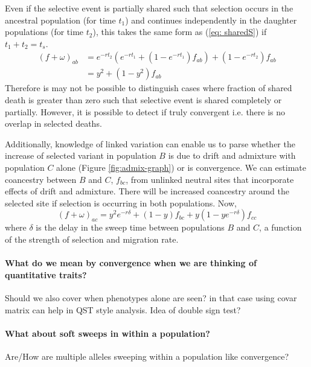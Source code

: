 \documentclass[a4paper,10pt]{article}
\begin{document}
Even if the selective event is partially shared such that selection occurs in the ancestral population (for time $t_1$) and continues independently in the daughter populations (for time $t_2$), this takes the same form as (\ref{eq: sharedS}) if $t_1 + t_2 = t_s$.
\begin{equation} \label{eq: sharedS}
\begin{split}
(f+\omega)_{ab} &= e^{-rt_2}\left(e^{-rt_1} + (1-e^{-rt_1})f_{ab}\right) + (1-e^{-rt_2})f_{ab} \\
 & = y^2 + (1-y^2) f_{ab}
 \end{split}
\end{equation}
Therefore is may not be possible to distinguish cases where fraction of shared death is greater than zero such that selective event is shared completely or partially. However, it is possible to detect if truly convergent i.e. there is no overlap in selected deaths.

Additionally, knowledge of linked variation can enable us to parse whether the increase of selected variant in population $B$ is due to drift and admixture with population $C$ alone (Figure \ref{fig:admix-graph}) or is convergence. We can estimate coancestry between $B$ and $C$, $f_{bc}$, from unlinked neutral sites that incorporate effects of drift and admixture. There will be increased coancestry around the selected site if selection is occurring in both populations. Now, 
\begin{equation} \label{eq: sharedS}
(f+\omega)_{ac} = y^2e^{-r\delta} + (1-y)f_{bc} + y(1-ye^{-r\delta})f_{cc}
\end{equation}
where $\delta$ is the delay in the sweep time between populations $B$ and $C$, a function of the strength of selection and migration rate.

\paragraph{What do we mean by convergence when we are thinking of quantitative traits?}
Should we also cover when phenotypes alone are seen? in that case using covar matrix can help in QST style analysis.
Idea of double sign test?

\paragraph{What about soft sweeps in within a population?}
Are/How are multiple alleles sweeping within a population like
convergence? 
\end{document}

